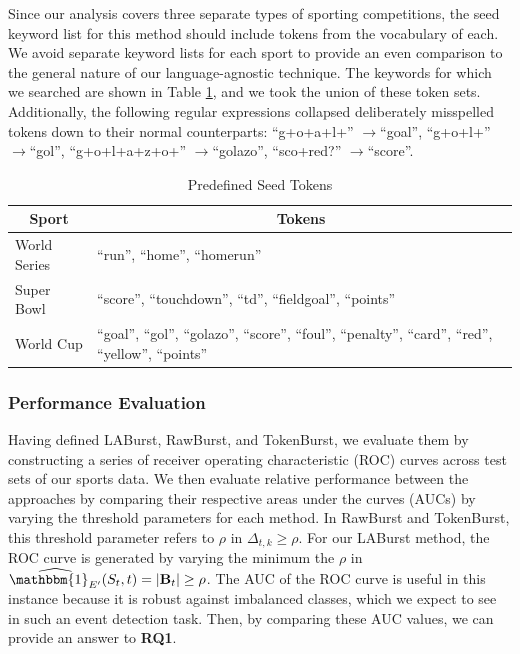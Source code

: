 \documentclass[letterpaper]{article}
\begin{document}
Since our analysis covers three separate types of sporting competitions, the seed keyword list for this method should include tokens from the vocabulary of each. 
We avoid separate keyword lists for each sport to provide an even comparison to the general nature of our language-agnostic technique.
The keywords for which we searched are shown in Table \ref{tab:targetTokens}, and we took the union of these token sets.
Additionally, the following regular expressions collapsed deliberately misspelled tokens down to their normal counterparts: ``g+o+a+l+'' $\rightarrow$``goal'', ``g+o+l+'' $\rightarrow$``gol'', ``g+o+l+a+z+o+'' $\rightarrow$``golazo'', ``sco+red?'' $\rightarrow$``score''.
%
\begin{table}[htdp]
\footnotesize
\caption{Predefined Seed Tokens}
\begin{center}
\begin{tabular}{|p{0.75in}|p{2.0in}|}
\hline
\multicolumn{1}{|c|}{\textbf{Sport}} & \multicolumn{1}{|c|}{\textbf{Tokens}} \\ \hline
World Series & ``run'', ``home'', ``homerun'' \\ \hline
Super Bowl & ``score'', ``touchdown'', ``td'', ``fieldgoal'', ``points'' \\ \hline
World Cup & ``goal'', ``gol'', ``golazo'', ``score'', ``foul'', ``penalty'', ``card'', ``red'', ``yellow'', ``points'' \\ \hline
\end{tabular}
\end{center}
\label{tab:targetTokens}
\end{table}

\subsubsection{Performance Evaluation}

Having defined LABurst, RawBurst, and TokenBurst, we evaluate them by constructing a series of receiver operating characteristic (ROC) curves across test sets of our sports data.
We then evaluate relative performance between the approaches by comparing their respective areas under the curves (AUCs) by varying the threshold parameters for each method.
In RawBurst and TokenBurst, this threshold parameter refers to $\rho$ in $\Delta_{t, k} \ge \rho$.
For our LABurst method, the ROC curve is generated by varying the minimum the $\rho$ in $\widehat{\mathbbm{1}_{E'}}(S_t, t) = |\mathbf{B}_t| \ge \rho$.
The AUC of the ROC curve is useful in this instance because it is robust against imbalanced classes, which we expect to see in such an event detection task.
Then, by comparing these AUC values, we can provide an answer to \textbf{RQ1}.
\end{document}
